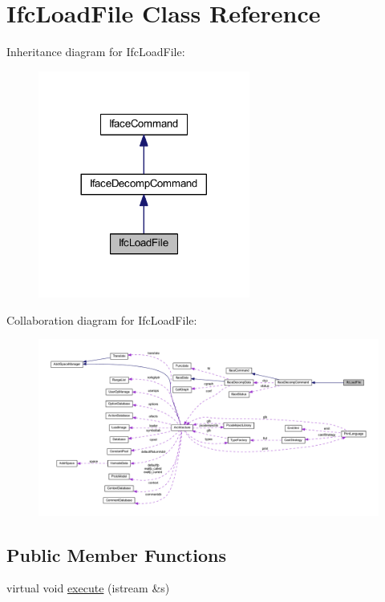 \hypertarget{class_ifc_load_file}{}\section{Ifc\+Load\+File Class Reference}
\label{class_ifc_load_file}


Inheritance diagram for Ifc\+Load\+File\+:
\nopagebreak
\begin{figure}[H]
\begin{center}
\leavevmode
\includegraphics[width=197pt]{class_ifc_load_file__inherit__graph}
\end{center}
\end{figure}


Collaboration diagram for Ifc\+Load\+File\+:
\nopagebreak
\begin{figure}[H]
\begin{center}
\leavevmode
\includegraphics[width=350pt]{class_ifc_load_file__coll__graph}
\end{center}
\end{figure}
\subsection*{Public Member Functions}
\begin{DoxyCompactItemize}
\item 
virtual void \mbox{\hyperlink{class_ifc_load_file_af7ea7408b40db6c11eff2a4f99f4ef80}{execute}} (istream \&s)
\end{DoxyCompactItemize}
